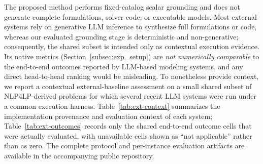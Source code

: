 \documentclass[3p]{elsarticle}
\begin{document}
The proposed method performs fixed-catalog scalar grounding and does not generate complete formulations, solver code, or executable models. Most external systems rely on generative LLM inference to synthesize full formulations or code, whereas our evaluated grounding stage is deterministic and non-generative; consequently, the shared subset is intended only as contextual execution evidence. Its native metrics (Section~\ref{subsec:exp_setup}) are \emph{not numerically comparable} to the end-to-end outcomes reported by LLM-based modeling systems, and any direct head-to-head ranking would be misleading. To nonetheless provide context, we report a contextual external-baseline assessment on a small shared subset of \textsc{NLP4LP}-derived problems for which several recent LLM systems were run under a common execution harness. Table~\ref{tab:ext-context} summarizes the implementation provenance and evaluation context of each system; Table~\ref{tab:ext-outcomes} records only the shared end-to-end outcome cells that were actually evaluated, with unavailable cells shown as ``not applicable'' rather than as zero. The complete protocol and per-instance evaluation artifacts are available in the accompanying public repository.
\end{document}
